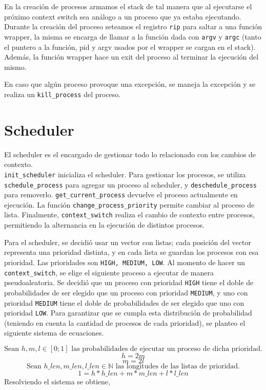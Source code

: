 \documentclass{article}
\begin{document}
En la creación de procesos armamos el stack de tal manera que al ejecutarse el próximo context switch sea análogo a un proceso que ya estaba ejecutando. Durante la creación del proceso seteamos el registro \texttt{rip} para saltar a una función wrapper, la misma se encarga de llamar a la función dada con \texttt{argv} y \texttt{argc} (tanto el puntero a la función, pid y argv usados por el wrapper se cargan en el stack). Además, la función wrapper hace un exit del proceso al terminar la ejecución del mismo.

En caso que algún proceso provoque una excepción, se maneja la excepción y se realiza un \texttt{kill\_process} del proceso.

\section {Scheduler}
El scheduler es el encargado de gestionar todo lo relacionado con los cambios de contexto. \\ \texttt{init\_scheduler} inicializa el scheduler. Para gestionar los procesos, se utiliza \texttt{schedule\_process} para agregar un proceso al scheduler, y \texttt{deschedule\_process} para removerlo. \texttt{get\_current\_process} devuelve el proceso actualmente en ejecución. La función \texttt{change\_process\_priority} permite cambiar al proceso de lista. Finalmente, \texttt{context\_switch} realiza el cambio de contexto entre procesos, permitiendo la alternancia en la ejecución de distintos procesos.

Para el scheduler, se decidió usar un vector con listas; cada posición del vector representa una prioridad distinta, y en cada lista se guardan los procesos con esa prioridad. Las prioridades son \texttt{HIGH, MEDIUM, LOW}.
Al momento de hacer un \texttt{context\_switch}, se elige el siguiente proceso a ejecutar de manera pseudoaleatoria. Se decidió que un proceso con prioridad \texttt{HIGH} tiene el doble de probabilidades de ser elegido que un proceso con prioridad \texttt{MEDIUM}, y uno con prioridad \texttt{MEDIUM} tiene el doble de probabilidades de ser elegido que uno con prioridad \texttt{LOW}. Para garantizar que se cumpla esta distribución de probabilidad (teniendo en cuenta la cantidad de procesos de cada prioridad), se planteo el siguiente sistema de ecuaciones.

\begin{equation*}
\text{Sean } h, m, l \in [0; 1] \text{ las probabilidades de ejecutar un proceso de dicha prioridad.}
\end{equation*}
\begin{equation*}
h = 2m
\end{equation*}
\begin{equation*}
m = 2l
\end{equation*}
\begin{equation*}
\text{Sean } h\_len, m\_len, l\_len \in \mathbb{N} \text{ las longitudes de las listas de prioridad.}
\end{equation*}
\begin{equation*}
1 = h * h\_len + m * m\_len + l * l\_len
\end{equation*}
Resolviendo el sistema se obtiene,
\end{document}

